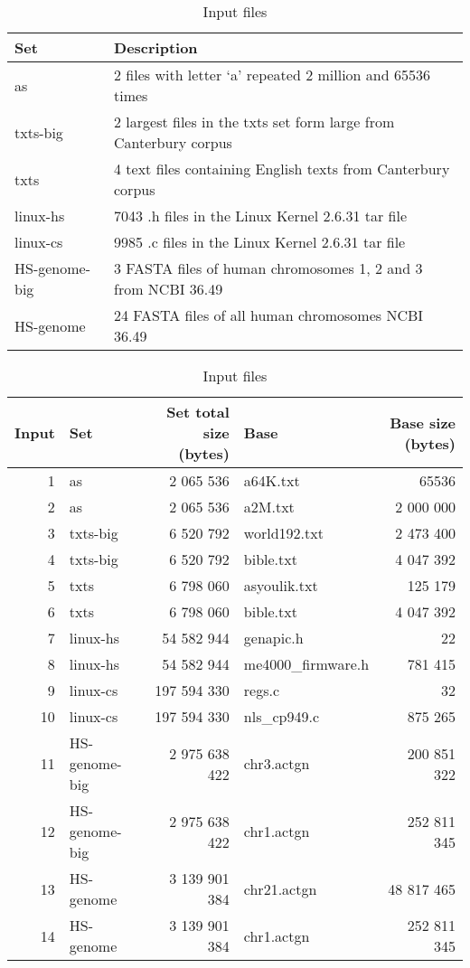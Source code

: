 \documentclass[submission]{dmtcs}
\newcommand\+[1]{\mathcal{#1}}
\begin{document}
\begin{table}[t!]
\caption{Input files\label{tbl:inpus}}
\small
\begin{center}
\begin{tabular}{ll}
\hline
Set & Description \\
\hline
as & 2 files with letter `a' repeated 2 million and 65536 times  \\
txts-big & 2 largest files in the txts set form large from Canterbury corpus\\
txts & 4 text files containing English texts from Canterbury corpus\\
linux-hs & 7043 .h files in the Linux Kernel 2.6.31 tar file  \\
linux-cs & 9985 .c files in the Linux Kernel 2.6.31 tar file \\
HS-genome-big & 3 FASTA files of human chromosomes 1, 2 and 3 from NCBI 36.49\\
HS-genome & 24 FASTA files of all human chromosomes NCBI 36.49\\
\end{tabular}
\end{center}
\small
\begin{center}
\begin{tabular}{rlrlr}
\hline
Input & Set & Set total size (bytes) & Base & Base size (bytes) \\
\hline
1 & as & 2 065 536 & a64K.txt & 65536\\
2 & as & 2 065 536 & a2M.txt & 2 000 000 \\
3 & txts-big & 6 520 792 & world192.txt & 2 473 400 \\
4 & txts-big & 6 520 792 & bible.txt & 4 047 392 \\ 
5 & txts & 6 798 060 & asyoulik.txt & 125 179 \\
6 & txts & 6 798 060 & bible.txt & 4 047 392 \\
7 & linux-hs & 54 582 944 & genapic.h & 22 \\
8 & linux-hs & 54 582 944 & me4000\_firmware.h & 781 415 \\
9 & linux-cs & 197 594 330 & regs.c & 32 \\ 
10 & linux-cs & 197 594 330 & nls\_cp949.c & 875 265 \\
11 & HS-genome-big & 2 975 638 422 & chr3.actgn & 200 851 322 \\
12 & HS-genome-big & 2 975 638 422 & chr1.actgn & 252 811 345 \\
13 & HS-genome & 3 139 901 384 & chr21.actgn & 48 817 465 \\
14 & HS-genome & 3 139 901 384 & chr1.actgn & 252 811 345  \\
\hline
\end{tabular}
\end{center}
\end{table}
\end{document}
